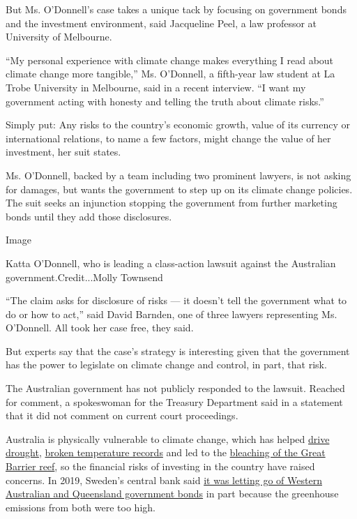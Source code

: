 But Ms. O'Donnell's case takes a unique tack by focusing on government
bonds and the investment environment, said Jacqueline Peel, a law
professor at University of Melbourne.

``My personal experience with climate change makes everything I read
about climate change more tangible,'' Ms. O'Donnell, a fifth-year law
student at La Trobe University in Melbourne, said in a recent interview.
``I want my government acting with honesty and telling the truth about
climate risks.''

Simply put: Any risks to the country's economic growth, value of its
currency or international relations, to name a few factors, might change
the value of her investment, her suit states.

Ms. O'Donnell, backed by a team including two prominent lawyers, is not
asking for damages, but wants the government to step up on its climate
change policies. The suit seeks an injunction stopping the government
from further marketing bonds until they add those disclosures.

Image

Katta O'Donnell, who is leading a class-action lawsuit against the
Australian government.Credit...Molly Townsend

``The claim asks for disclosure of risks --- it doesn't tell the
government what to do or how to act,'' said David Barnden, one of three
lawyers representing Ms. O'Donnell. All took her case free, they said.

But experts say that the case's strategy is interesting given that the
government has the power to legislate on climate change and control, in
part, that risk.

The Australian government has not publicly responded to the lawsuit.
Reached for comment, a spokeswoman for the Treasury Department said in a
statement that it did not comment on current court proceedings.

Australia is physically vulnerable to climate change, which has helped
\href{https://www.nytimes3xbfgragh.onion/2019/12/08/world/australia/water-drought-climate.html}{drive
drought},
\href{https://www.nytimes3xbfgragh.onion/2019/12/18/world/australia/record-heat.html}{broken
temperature records} and led to the
\href{https://www.nytimes3xbfgragh.onion/2020/04/06/world/australia/great-barrier-reefs-bleaching-dying.html}{bleaching
of the Great Barrier reef}, so the financial risks of investing in the
country have raised concerns. In 2019, Sweden's central bank said
\href{https://www.smh.com.au/business/markets/sweden-dumps-aussie-bonds-as-country-not-known-for-good-climate-work-20191114-p53agw.html}{it
was letting go of Western Australian and Queensland government bonds} in
part because the greenhouse emissions from both were too high.

